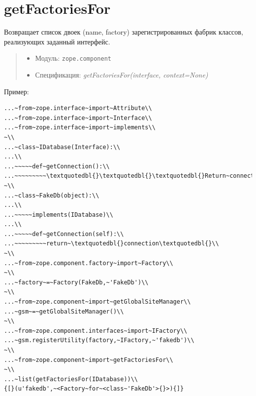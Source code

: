 \documentclass[a4paper,openany,twoside,draft]{book}
\providecommand*{\DUroletitlereference}[1]{\textsl{#1}}
\begin{document}
\section*{getFactoriesFor%
  \label{getfactoriesfor}%
}

Возвращает список двоек (name, factory) зарегистрированных фабрик
классов, реализующих заданный интерфейс.

\begin{quote}

\begin{itemize}

\item Модуль: \texttt{zope.component}

\item Спецификация: \DUroletitlereference{getFactoriesFor(interface, context=None)}

\end{itemize}

\end{quote}

Пример:

\begin{verbatim}
...~from~zope.interface~import~Attribute\\
...~from~zope.interface~import~Interface\\
...~from~zope.interface~import~implements\\
~\\
...~class~IDatabase(Interface):\\
...\\
...~~~~~def~getConnection():\\
...~~~~~~~~~\textquotedbl{}\textquotedbl{}\textquotedbl{}Return~connection~object\textquotedbl{}\textquotedbl{}\textquotedbl{}\\
~\\
...~class~FakeDb(object):\\
...\\
...~~~~~implements(IDatabase)\\
...\\
...~~~~~def~getConnection(self):\\
...~~~~~~~~~return~\textquotedbl{}connection\textquotedbl{}\\
~\\
...~from~zope.component.factory~import~Factory\\
~\\
...~factory~=~Factory(FakeDb,~'FakeDb')\\
~\\
...~from~zope.component~import~getGlobalSiteManager\\
...~gsm~=~getGlobalSiteManager()\\
~\\
...~from~zope.component.interfaces~import~IFactory\\
...~gsm.registerUtility(factory,~IFactory,~'fakedb')\\
~\\
...~from~zope.component~import~getFactoriesFor\\
~\\
...~list(getFactoriesFor(IDatabase))\\
{[}(u'fakedb',~<Factory~for~<class~'FakeDb'>{}>){]}
\end{verbatim}
\end{document}
